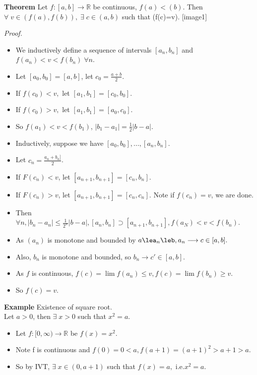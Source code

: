 \documentclass[12pt]{article}
\begin{document}
\begin{block}{\bf Theorem} Let $f:[a,b] \rightarrow \mathbb{R}$ be continuous, $f(a)<(b)$. Then $\forall\;v\in (f(a),f(b)),\;\exists\;c\in (a,b)$ such that (f(c)=v). [image1]
\end{block}

{\sl Proof.}
\begin{itemize}
    \item We inductively define a sequence of intervals $[a_n,b_n]$ and $f(a_n)<v<f(b_n)\;\forall n$.
    \item Let $[a_0,b_0]=[a,b]$, let $c_0 = \frac{a+b}{2}$.
    \item If $f(c_0) <v,$ let $[a_1,b_1] = [c_0, b_0]$.
    \item If $f(c_0)>v,$ let $[a_1,b_1]=[a_0,c_0]$.
    \item So $f(a_1)<v<f(b_1)$, $|b_1-a_1| = \frac{1}{2}|b-a|$.
    \item Inductively, suppose we have $[a_0,b_0],...,[a_n,b_n]$.
    \item Let $c_n = \frac{a_n+b_n]}{2}$.
    \item If $F(c_n)<v$, let $[a_{n+1},b_{n+1}] = [c_n,b_n]$.
    \item If $F(c_n)>v$, let $[a_{n+1},b_{n+1}] = [c_n,c_n]$.
    Note if $f(c_n)=v$, we are done.
    \item Then $\forall n, |b_n-a_n| \le \frac{1}{2^n} |b-a|, [a_n,b_n]\supset [a_{n+1},b_{n+1}], f(a_N)<v<f(b_n)$.
    \item As $(a_n)$ is monotone and bounded by $a\lea_n\leb, a_n \longrightarrow c\in[a,b].$
    \item Also, $b_n$ is monotone and bounded, so $b_n\longrightarrow c' \in [a,b]$.
    \item As $f$ is continuous, $f(c) = \lim f(a_n)\le v, f(c) = \lim f(b_n) \ge v$.
    \item So $f(c) = v$.
\end{itemize}

\vspace{1.5\baselinestretch}
\begin{block}{\bf Example} Existence of square root.\\
Let $a>0$, then $\exists\;x>0$ such that $x^2=a$.
\begin{itemize}
    \item Let $f:[0,\infty)\rightarrow\mathbb{R}$ be $f(x) = x^2$.
    \item Note f is continuous and $f(0)=0<a, f(a+1) = (a+1)^2 > a+1>a$.
    \item So by IVT, $\exists\;x\in(0,a+1)$ such that $f(x)=a,$ i.e.$x^2=a$.
\end{itemize}
\end{block}
\end{document}
